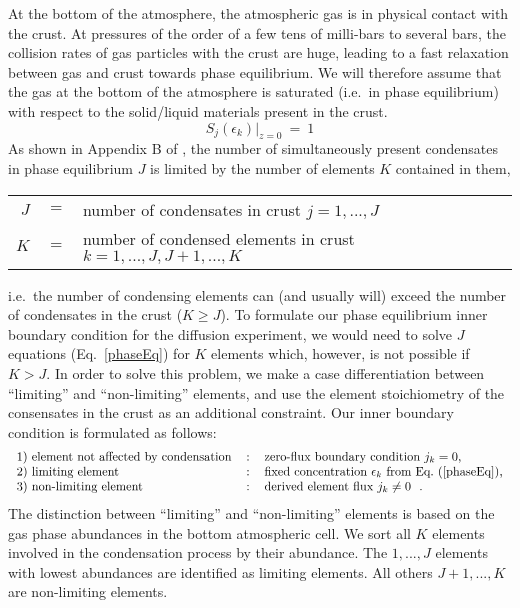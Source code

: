 \documentclass[11pt]{article}
\def\ek{\epsilon_k}
\begin{document}
At the bottom of the atmosphere, the atmospheric gas is in physical
contact with the crust. At pressures of the order of a few tens of
milli-bars to several bars, the collision rates of gas particles with
the crust are huge, leading to a fast relaxation between gas and crust
towards phase equilibrium.  We will therefore assume that the gas at
the bottom of the atmosphere is saturated (i.e.\ in phase equilibrium)
with respect to the solid/liquid materials present in the crust.
\begin{equation}
  S_j(\ek)\Big|_{z=0} ~=~ 1
  \label{phaseEq}
\end{equation}
As shown in Appendix B of \citep{Woitke2017}, the number of
simultaneously present condensates in phase equilibrium $J$ is limited
by the number of elements $K$ contained in them,
\smallskip
\begin{center}
\begin{tabular}{rcl}
  $J$ &$=$& number of condensates in crust $j=1,...,J$\\
  $K$ &$=$& number of condensed elements in crust $k=1,...,J,J+1,...,K$ \\
\end{tabular}
\end{center} 
i.e.\ the number of condensing elements can (and usually will) exceed
the number of condensates in the crust ($K\geq J$). To formulate our
phase equilibrium inner boundary condition for the diffusion
experiment, we would need to solve $J$ equations (Eq.~\ref{phaseEq})
for $K$ elements which, however, is not possible if $K>J$. In order to
solve this problem, we make a case differentiation between
``limiting'' and ``non-limiting'' elements, and use the element
stoichiometry of the consensates in the crust as an additional
constraint. Our inner boundary condition is formulated as follows:
\begin{equation}
\mbox{\begin{tabular}{lcl}
  1) element not affected by condensation &:& zero-flux boundary
                                              condition $j_k=0$,\\
  2) limiting element &:& fixed concentration $\ek$ from
            Eq.~(\ref{phaseEq}),\\
  3) non-limiting element &:& derived element flux $j_k\neq0$  \ .
\end{tabular}}
\label{eq:innerBC}
\end{equation}
The distinction between ``limiting'' and ``non-limiting'' elements is
based on the gas phase abundances in the bottom atmospheric cell. We
sort all $K$ elements involved in the condensation process by their
abundance. The $1,...,J$ elements with lowest abundances are
identified as limiting elements. All others $J+1,...,K$ are
non-limiting elements.
\end{document}

